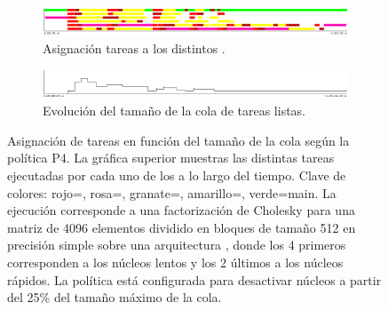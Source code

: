 \begin{figure}
  \centering
  \begin{framed}
    \begin{subfigure}{1\textwidth}
      \centering
      \includegraphics[width=1\linewidth]{Figures/Politicas_evo/Apagado_tareas.png}
      \caption{Asignación tareas a los distintos \wts.}
      \label{}
    \end{subfigure}

\vspace{0.5cm}

    \begin{subfigure}{1\textwidth}
      \centering
      \includegraphics[width=1\linewidth]{Figures/Politicas_evo/Apagado_colas.png}
      \caption{Evolución del tamaño de la cola de tareas listas.}
      \label{}
    \end{subfigure}  
    
  \end{framed}
  \caption[Asignación de tareas en función del tamaño de la cola según la
  política P4]{Asignación de tareas en función del tamaño de la cola según
    la política P4. La gráfica superior muestras las distintas tareas
    ejecutadas por cada uno de los \wts a lo largo del tiempo. Clave de
    colores: rojo=\trsm, rosa=\potrf, granate=\syrk, amarillo=\gemm,
    verde={\sc main}. La ejecución corresponde a una factorización de
    Cholesky para una matriz de 4096 elementos dividido en bloques de
    tamaño 512 en precisión simple sobre una arquitectura \juno, donde los
    4 primeros \wts corresponden a los núcleos lentos y los 2 últimos a los
    núcleos rápidos. La política está configurada para desactivar núcleos a
    partir del 25\% del tamaño máximo de la cola.}
  \label{fig:P4-evo}
\end{figure}



